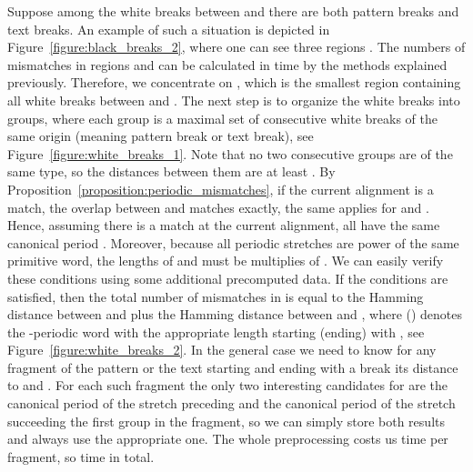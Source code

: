 \documentclass[runningheads]{llncs}
\begin{document}
\begin{mycases}[listparindent=15pt]
\item Suppose among the white breaks between  and  there are both pattern breaks and text breaks. An example of such a situation is depicted in Figure~\ref{figure:black_breaks_2}, where one can see three regions .
The numbers of mismatches in regions  and  can be calculated in  time by the methods explained previously. Therefore, we concentrate on , which is the smallest region containing all white breaks between  and . The next step is to organize the white breaks into groups, where each group is a maximal set of consecutive white breaks of the same origin (meaning pattern break or text break),
see Figure~\ref{figure:white_breaks_1}.
Note that no two consecutive groups are of the same type, so the distances between them are at least . By Proposition~\ref{proposition:periodic_mismatches}, if the current alignment is a match, the overlap between  and  matches exactly, the same applies for  and . Hence, assuming there is a match at the current alignment, all  have the same canonical period . Moreover, because all periodic stretches are power of the same primitive word, the lengths of  and  must be multiplies of .
We can easily verify these conditions using some additional precomputed data. If the conditions are satisfied, then the total number of mismatches in  is equal to the Hamming distance between  and  plus the Hamming distance between  and , where  () denotes the -periodic word with the appropriate length starting (ending) with , see Figure~\ref{figure:white_breaks_2}. In the general case we need to know for any fragment of the pattern or the text starting and ending with a break its distance to  and . For each such fragment the only two interesting candidates for  are the canonical period of the stretch preceding and the canonical period of the stretch succeeding the first group in the fragment, so we can simply store both results and always use the appropriate one. The whole preprocessing costs us  time per fragment, so  time in total.


\end{mycases}
\end{document}

